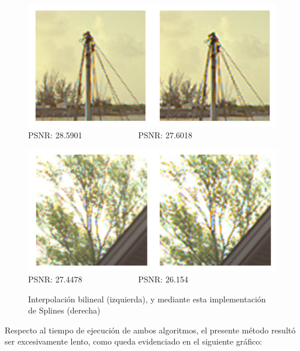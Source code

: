 \documentclass[a4paper]{article}
\begin{document}
\begin{figure}[h!]
	\begin{center}
	    \includegraphics[scale=0.47]{imagenes/Splines/RecortesSplines/promedio/barcos.png}\\
	    PSNR: 28.5901 \ \ \ \ \ \ \ \ \ \ \ \ \ PSNR: 27.6018
	\end{center}
	\begin{center}
	    \includegraphics[scale=0.47]{imagenes/Splines/RecortesSplines/promedio/arbol.png}\\
	    PSNR: 27.4478 \ \ \ \ \ \ \ \ \ \ \ \ \ PSNR: 26.154
	\end{center}
	\caption{Interpolación bilineal (izquierda), y mediante esta implementación de Splines (derecha)}
	\label{splines2}
\end{figure}

Respecto al tiempo de ejecución de ambos algoritmos, el presente método resultó ser excesivamente lento, como queda evidenciado en el siguiente gráfico:
\end{document}
